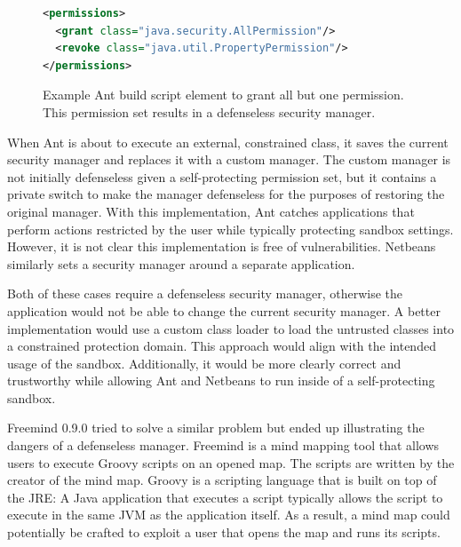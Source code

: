 \documentclass{sig-alternate}
\begin{document}
\begin{figure}
\begin{lstlisting}[language=XML,basicstyle={\scriptsize}]
<permissions>   
  <grant class="java.security.AllPermission"/>   
  <revoke class="java.util.PropertyPermission"/> 
</permissions>
\end{lstlisting}

\caption{Example Ant build script element to grant all but one permission.
This permission set results in a defenseless security manager. }
\label{fig:Ant Permissions Example}
\end{figure}

When Ant is about to execute an external, constrained class, it saves the current security manager and replaces it with a custom manager. The custom manager is not initially defenseless given a self-protecting permission set, but it contains a private switch to make the manager defenseless for the purposes of restoring the original manager. With this implementation, Ant catches applications that perform actions
restricted by the user while typically protecting sandbox settings. However, it is not clear this implementation
is free of vulnerabilities. Netbeans similarly sets a security manager around a separate application.

Both of these cases require a defenseless security manager, otherwise
the application would not be able to change the current security manager.
A better implementation would use a custom class
loader to load the untrusted classes into a constrained protection
domain. This approach would align with the intended usage of the sandbox.
Additionally, it would be more clearly correct and trustworthy while
allowing Ant and Netbeans to run inside of a self-protecting sandbox.

Freemind 0.9.0 tried to solve a similar problem but ended up illustrating
the dangers of a defenseless manager. Freemind is a mind mapping tool
that allows users to execute Groovy scripts on an opened map. The
scripts are written by the creator of the mind map. Groovy is a scripting
language that is built on top of the JRE: A Java application that
executes a script typically allows the script to execute in the same
JVM as the application itself. As a result, a mind map could potentially
be crafted to exploit a user that opens the map and runs its scripts.
\end{document}

